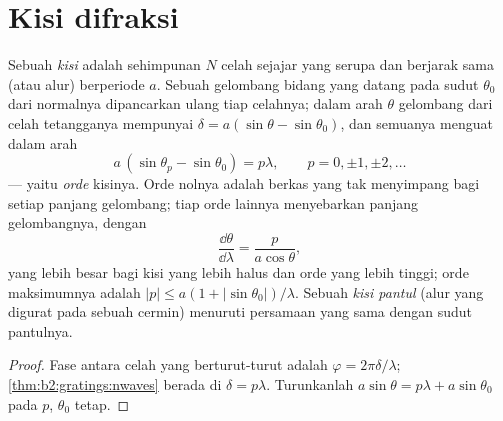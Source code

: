 \section{Kisi difraksi}

\begin{proposition}\label{prop:b2:gratings:equation}
Sebuah \emph{kisi} adalah sehimpunan $N$ celah sejajar yang serupa dan berjarak sama
(atau alur) berperiode $a$. Sebuah gelombang bidang yang datang pada sudut $\theta_0$
dari normalnya dipancarkan ulang tiap celahnya; dalam arah $\theta$
gelombang dari celah tetangganya mempunyai  $\delta = a(\sin\theta
- \sin\theta_0)$, dan semuanya menguat dalam arah
\[
a\,(\sin\theta_p - \sin\theta_0) = p\lambda , \qquad p = 0, \pm1, \pm2, \dots
\]
--- yaitu \emph{orde} kisinya. Orde nolnya adalah berkas yang tak
menyimpang bagi setiap panjang gelombang; tiap orde lainnya menyebarkan panjang gelombangnya,
dengan \emph{}
\[
\frac{\dd\theta}{\dd\lambda} = \frac{p}{a\cos\theta} ,
\]
yang lebih besar bagi kisi yang lebih halus dan orde yang lebih tinggi; orde maksimumnya adalah
$|p| \le a(1 + |\sin\theta_0|)/\lambda$. Sebuah \emph{kisi pantul} (alur yang digurat
pada sebuah cermin) menuruti persamaan yang sama dengan sudut pantulnya.
\end{proposition}

\begin{proof}
Fase antara celah yang berturut-turut adalah $\varphi = 2\pi\delta/\lambda$;  \cref{thm:b2:gratings:nwaves} berada di $\delta = p\lambda$.
Turunkanlah $a\sin\theta = p\lambda + a\sin\theta_0$ pada $p$, $\theta_0$ tetap.
\end{proof}

